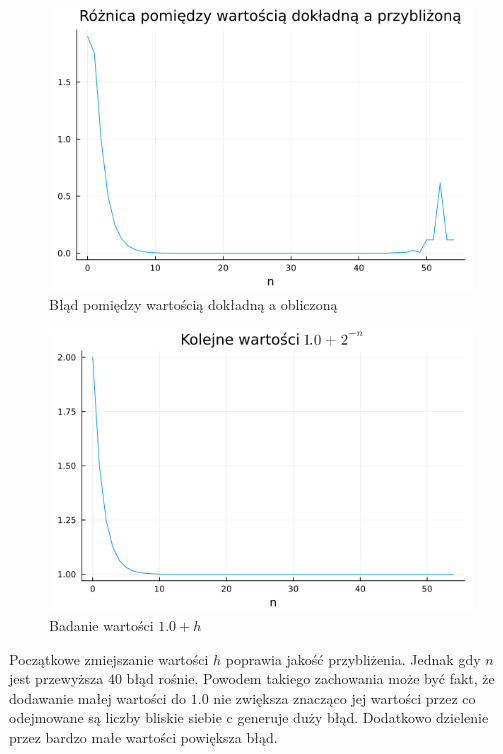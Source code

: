 \documentclass{article}
\begin{document}
\begin{figure}[h!]
    \centering
    \includegraphics[scale=0.35]{plots/zad7-plot2.png}
    \caption{Błąd pomiędzy wartością dokładną a obliczoną}
\end{figure}

\newpage

\begin{figure}[h!]
    \centering
    \includegraphics[scale=0.35]{plots/zad7-plot0.png}
    \caption{Badanie wartości $1.0 + h$}
\end{figure}

Początkowe zmiejszanie wartości $h$ poprawia jakość przybliżenia. Jednak gdy $n$ jest przewyższa $40$ błąd rośnie. Powodem takiego zachowania może być fakt, że dodawanie małej wartości do $1.0$ nie zwiększa znacząco jej wartości przez co odejmowane są liczby bliskie siebie c generuje duży błąd.
Dodatkowo dzielenie przez bardzo małe wartości powiększa błąd.
\end{document}
